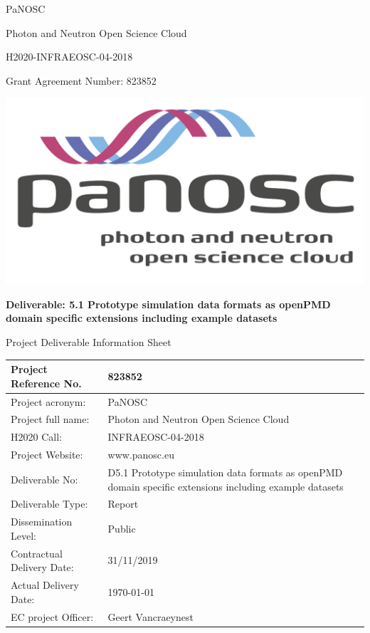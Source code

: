 \documentclass[11pt, a4paper]{article}
\begin{document}
{
	\centering
    \begin{onehalfspace}
    \sffamily
	{\LARGE PaNOSC \par}
	{\LARGE Photon and Neutron Open Science Cloud \par}
	{\LARGE H2020-INFRAEOSC-04-2018 \par}
	{\LARGE Grant Agreement Number: 823852 \par}
	\end{onehalfspace}

	\vfill
	\includegraphics[width=\textwidth]{PaNOSClogo_web_RGB.pdf}\par
	\vfill

	{\large \textbf{Deliverable: 5.1 Prototype simulation data formats as openPMD domain specific extensions including example datasets}}
} %
\newpage

\fancyfoot{} %
\fancyfoot[R]{\thepage}
{\sffamily\LARGE Project Deliverable Information Sheet \par}

\begin{center}
\begin{tabular}{ | m{5.2cm}| m{10.7cm} | }
\hline
Project Reference No. & 823852 \\
\hline
Project acronym: & PaNOSC \\
\hline
Project full name: & Photon and Neutron Open Science Cloud \\
\hline
H2020 Call: & INFRAEOSC-04-2018 \\
\hline
Project Website: & www.panosc.eu \\
\hline
Deliverable No: & D5.1 Prototype simulation data formats as openPMD domain specific extensions including example datasets \\
\hline
Deliverable Type: & Report \\
\hline
Dissemination Level: & Public \\
\hline
Contractual Delivery Date: & 31/11/2019 \\
\hline
Actual Delivery Date: & \today \\
\hline
EC project Officer: & Geert Vancraeynest \\
\hline
\end{tabular}
\end{center}
\end{document}
